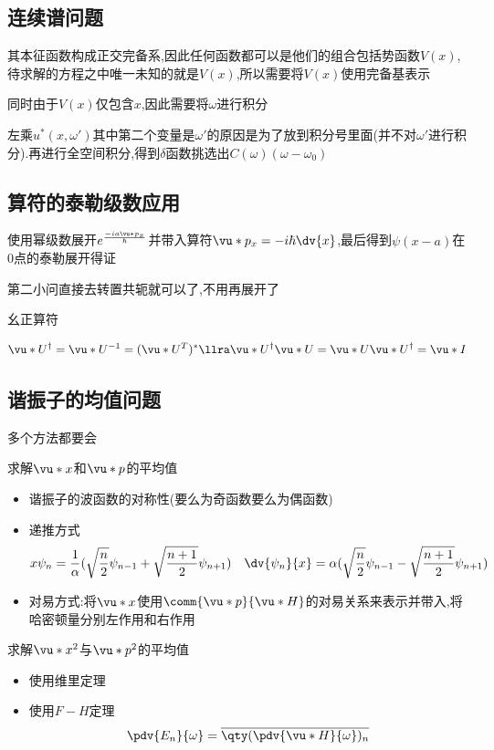         \subsection{连续谱问题}
            其本征函数构成正交完备系,因此任何函数都可以是他们的组合包括势函数$V(x)$,待求解的方程之中唯一未知的就是$V(x)$,所以需要将$V(x)$使用完备基表示
            
            同时由于$V(x)$仅包含$x$,因此需要将$\omega$进行积分

            左乘$u^{*}(x,\omega')$其中第二个变量是$\omega'$的原因是为了放到积分号里面(并不对$\omega'$进行积分).再进行全空间积分,得到$\delta$函数挑选出$C(\omega)(\omega-\omega_{0})$

        \subsection{算符的泰勒级数应用}
            使用幂级数展开$e^{\frac{-ia\vu*{p}_{x}}{\hbar}}$并带入算符$\vu*{p}_{x} = - i \hbar \dv{x}$,最后得到$\psi(x-a)$在$0$点的泰勒展开得证

            第二小问直接去转置共轭就可以了,不用再展开了
            \begin{formal}
                幺正算符

                $$  \vu*{U}^{\dagger} = \vu*{U}^{-1} = (\vu*{U}^{T})^{*} \llra \vu*{U}^{\dagger} \vu*{U} = \vu*{U} \vu*{U}^{\dagger}  = \vu*{I} $$
            \end{formal}

        \subsection{谐振子的均值问题}
            多个方法都要会
            \begin{formal}

                求解$\vu*{x}$和$\vu*{p}$的平均值
                \begin{itemize}
                    \item   谐振子的波函数的对称性(要么为奇函数要么为偶函数)
                    \item   递推方式 
                    $$  
                    x \psi_{n} = \frac{1}{\alpha}(\sqrt{\frac{n}{2}}\psi_{n-1} + \sqrt{\frac{n+1}{2}} \psi_{n+1})  
                    \quad \dv{\psi_{n}}{x} = \alpha (\sqrt{\frac{n}{2}}\psi_{n-1} - \sqrt{\frac{n+1}{2}} \psi_{n+1}) 
                    $$
                    \item   对易方式:将$\vu*{x}$使用$\comm{\vu*{p}}{\vu*{H}}$的对易关系来表示并带入,将哈密顿量分别左作用和右作用
                \end{itemize}

                求解$\vu*{x}^{2}$与$\vu*{p}^{2}$的平均值
                \begin{itemize}
                    \item 使用维里定理
                    \item 使用$F-H$定理
                    $$ \pdv{E_{n}}{\omega}  = \overline{\qty(\pdv{\vu*{H}}{\omega})_{n}} $$
                \end{itemize}

            \end{formal}


